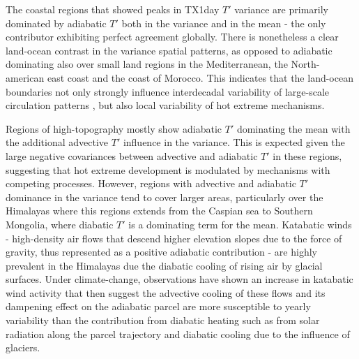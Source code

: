 \documentclass[11pt,a4paper,twoside,openright]{report}
\theoremstyle{definition}
\begin{document}
The coastal regions that showed peaks in TX1day \(T'\) variance are primarily dominated by adiabatic \(T'\) both in the variance and in the mean - the only contributor exhibiting perfect agreement globally. There is nonetheless a clear land-ocean contrast in the variance spatial patterns, as opposed to adiabatic dominating also over small land regions in the Mediterranean, the North-american east coast and the coast of Morocco. This indicates that the land-ocean boundaries not only strongly influence interdecadal variability of large-scale circulation patterns \citep{wake_landsea_2014}, but also local variability of hot extreme mechanisms.

Regions of high-topography mostly show adiabatic \(T'\) dominating the mean with the additional advective \(T'\) influence in the variance. This is expected given the large negative covariances between advective and adiabatic \(T'\) in these regions, suggesting that hot extreme development is modulated by mechanisms with competing processes. However, regions with advective and adiabatic \(T'\) dominance in the variance tend to cover larger areas, particularly over the Himalayas where this regions extends from the Caspian sea to Southern Mongolia, where diabatic \(T'\) is a dominating term for the mean. Katabatic winds - high-density air flows that descend higher elevation slopes due to the force of gravity, thus represented as a positive adiabatic contribution - are highly prevalent in the Himalayas due the diabatic cooling of rising air by glacial surfaces. Under climate-change, observations have shown an increase in katabatic wind activity \citep{salerno_local_2023} that then suggest the advective cooling of these flows and its dampening effect on the adiabatic parcel are more susceptible to yearly variability than the contribution from diabatic heating such as from solar radiation along the parcel trajectory and diabatic cooling due to the influence of glaciers.
\end{document}
